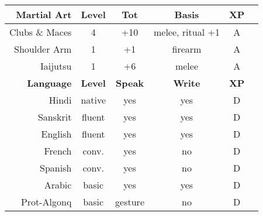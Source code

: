 \documentclass[11pt]{article}
\newcommand{\heading}[1]{{\sc\bfseries #1}}
\begin{document}
\begin{tabular}[t]{|r|c|c|c|c|c|}
\hline
%
%
\heading{Martial Art} & \heading{Level} & \heading{Tot} & \heading{Basis} & \heading{XP}
\\ \hline \hline
\sc Clubs \& Maces & 4 & +10 & melee, ritual +1 & A
\\
\sc Shoulder Arm & 1 & +1 & firearm & A
\\
\sc Iaijutsu & 1 & +6 & melee & A
\\[12pt] \hline \hline
%
\heading{Language} & \heading{Level} & \heading{Speak} & \heading{Write} & \heading{XP}
\\ \hline \hline
\sc Hindi & native & yes & yes & D
\\
\sc Sanskrit & fluent & yes & yes & D
\\
\sc English & fluent & yes & yes & D
\\
\sc French & conv. & yes & no & D
\\
\sc Spanish & conv. & yes & no & D
\\
\sc Arabic & basic & yes & yes & D
\\
\sc Prot-Algonq & basic & gesture & no & D
\\ \hline
\end{tabular}
\end{document}

